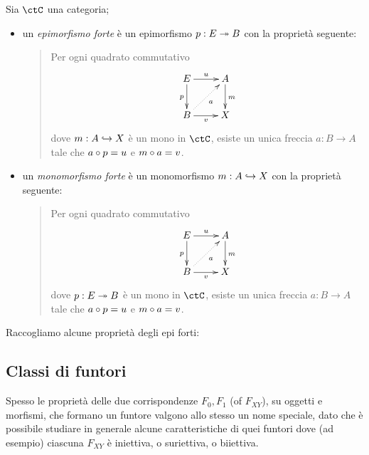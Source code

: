 \begin{definition}
	Sia \(\ctC\) una categoria;
	\begin{itemize}
		\item un \emph{epimorfismo forte} è un epimorfismo \(p : E\twoheadrightarrow B\) con la proprietà seguente:
		      \begin{quote}
			      Per ogni quadrato commutativo
			      \[\xymatrix{
					      E \ar[r]^u\ar[d]_p & A\ar[d]^m\\
					      B \ar[r]_v \ar@{.>}[ur]_a & X
				      }\]
			      dove \(m : A\hookrightarrow X\) è un mono in \(\ctC\), esiste un unica freccia \(a : B\to A\) tale che \(a\circ p=u\) e \(m\circ a =v\).
		      \end{quote}
		\item un \emph{monomorfismo forte} è un monomorfismo \(m : A\hookrightarrow X\) con la proprietà seguente:
		      \begin{quote}
			      Per ogni quadrato commutativo
			      \[\xymatrix{
					      E \ar[r]^u\ar[d]_p & A\ar[d]^m\\
					      B \ar[r]_v \ar@{.>}[ur]_a & X
				      }\]
			      dove \(p : E\twoheadrightarrow B\) è un mono in \(\ctC\), esiste un unica freccia \(a : B\to A\) tale che \(a\circ p=u\) e \(m\circ a =v\).
		      \end{quote}
	\end{itemize}
\end{definition}
Raccogliamo alcune proprietà degli epi forti:
\begin{proposition}
	\Todo{}
\end{proposition}
\subsection{Classi di funtori}\label{ssec:classi_di_funtori}
Spesso le proprietà delle due corrispondenze \(F_0,F_1\) (of \(F_{XY}\)), su oggetti e morfismi, che formano un funtore valgono allo stesso un nome speciale, dato che è possibile studiare in generale alcune caratteristiche di quei funtori dove (ad esempio) ciascuna \(F_{XY}\) è iniettiva, o suriettiva, o biiettiva.

